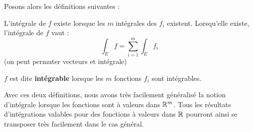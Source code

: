 \documentclass[../integ-proba.tex]{subfiles}
\begin{document}
  Posons alors les définitions suivantes :

  \begin{defi}
    L'intégrale de $f$ existe lorsque les $m$ intégrales des $f_i$ existent.
    Lorsqu'elle existe, l'intégrale de $f$ vaut :
    \begin{displaymath}
      \int_E f = \sum_{i=1}^{m}\int_E f_i
    \end{displaymath}
    (on peut permuter vecteurs et intégrale)
  \end{defi}

  \begin{defi}
    $f$ est dite \textbf{intégrable} lorsque les $m$ fonctions $f_i$ sont intégrables.
  \end{defi}

  Avec ces deux définitions, nous avons très facilement généralisé la notion d'intégrale lorsque les fonctions sont à valeurs dans $\mathbb{R}^m$.
  Tous les résultats d'intégrations valables pour des fonctions à valeurs dans $\mathbb{R}$ pourront ainsi se transposer très facilement dans le cas général.
\end{document}
